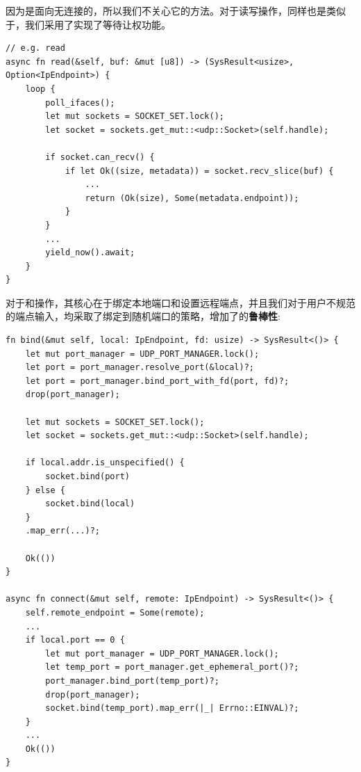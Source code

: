 \documentclass{article}
\begin{document}
因为是面向无连接的，所以我们不关心它的方法。对于读写操作，同样也是类似于，我们采用了实现了等待让权功能。

\begin{lstlisting}
// e.g. read
async fn read(&self, buf: &mut [u8]) -> (SysResult<usize>, Option<IpEndpoint>) {
    loop {
        poll_ifaces();
        let mut sockets = SOCKET_SET.lock();
        let socket = sockets.get_mut::<udp::Socket>(self.handle);

        if socket.can_recv() {
            if let Ok((size, metadata)) = socket.recv_slice(buf) {
                ...
                return (Ok(size), Some(metadata.endpoint));
            }
        }
        ...
        yield_now().await;
    }
}
\end{lstlisting}

对于和操作，其核心在于绑定本地端口和设置远程端点，并且我们对于用户不规范的端点输入，均采取了绑定到随机端口的策略，增加了的\textbf{鲁棒性}:

\begin{lstlisting}
fn bind(&mut self, local: IpEndpoint, fd: usize) -> SysResult<()> {
    let mut port_manager = UDP_PORT_MANAGER.lock();
    let port = port_manager.resolve_port(&local)?;
    let port = port_manager.bind_port_with_fd(port, fd)?;
    drop(port_manager);

    let mut sockets = SOCKET_SET.lock();
    let socket = sockets.get_mut::<udp::Socket>(self.handle);

    if local.addr.is_unspecified() {
        socket.bind(port)
    } else {
        socket.bind(local)
    }
    .map_err(...)?;

    Ok(())
}
    
async fn connect(&mut self, remote: IpEndpoint) -> SysResult<()> {
    self.remote_endpoint = Some(remote);
    ...
    if local.port == 0 {
        let mut port_manager = UDP_PORT_MANAGER.lock();
        let temp_port = port_manager.get_ephemeral_port()?;
        port_manager.bind_port(temp_port)?;
        drop(port_manager);
        socket.bind(temp_port).map_err(|_| Errno::EINVAL)?;
    }
    ...
    Ok(())
}
\end{lstlisting}



\end{document}
